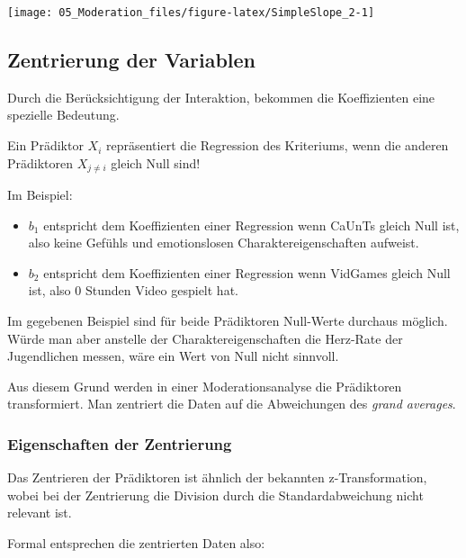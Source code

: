 \documentclass[]{article}
\providecommand{\tightlist}{%
  \setlength{\itemsep}{0pt}\setlength{\parskip}{0pt}}
\begin{document}
\begin{center}\texttt{[image: 05\_Moderation\_files/figure-latex/SimpleSlope\_2-1]} \end{center}

\hypertarget{zentrierung-der-variablen}{%
\subsection*{Zentrierung der Variablen}\label{zentrierung-der-variablen}}

Durch die Berücksichtigung der Interaktion, bekommen die Koeffizienten eine spezielle Bedeutung.

Ein Prädiktor \(X_i\) repräsentiert die Regression des Kriteriums, wenn die anderen Prädiktoren \(X_{j \ne i}\) gleich Null sind!

Im Beispiel:

\begin{itemize}
\tightlist
\item
  \(b_1\) entspricht dem Koeffizienten einer Regression wenn CaUnTs gleich Null ist, also keine Gefühls und emotionslosen Charaktereigenschaften aufweist.
\item
  \(b_2\) entspricht dem Koeffizienten einer Regression wenn VidGames gleich Null ist, also 0 Stunden Video gespielt hat.
\end{itemize}

Im gegebenen Beispiel sind für beide Prädiktoren Null-Werte durchaus möglich. Würde man aber anstelle der Charaktereigenschaften die Herz-Rate der Jugendlichen messen, wäre ein Wert von Null nicht sinnvoll.

Aus diesem Grund werden in einer Moderationsanalyse die Prädiktoren transformiert. Man zentriert die Daten auf die Abweichungen des \emph{grand averages}.

\hypertarget{eigenschaften-der-zentrierung}{%
\subsubsection*{Eigenschaften der Zentrierung}\label{eigenschaften-der-zentrierung}}

Das Zentrieren der Prädiktoren ist ähnlich der bekannten z-Transformation, wobei bei der Zentrierung die Division durch die Standardabweichung nicht relevant ist.

Formal entsprechen die zentrierten Daten also:
\end{document}
